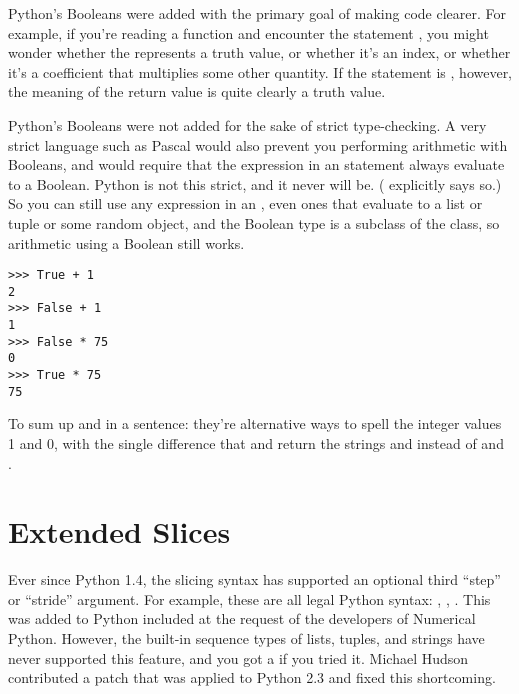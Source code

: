 \documentclass{howto}
\begin{document}
Python's Booleans were added with the primary goal of making code
clearer.  For example, if you're reading a function and encounter the
statement , you might wonder whether the 
represents a truth value, or whether it's an index, or whether it's a
coefficient that multiplies some other quantity.  If the statement is
, however, the meaning of the return value is quite
clearly a truth value.

Python's Booleans were not added for the sake of strict type-checking.
A very strict language such as Pascal would also prevent you
performing arithmetic with Booleans, and would require that the
expression in an  statement always evaluate to a Boolean.
Python is not this strict, and it never will be.  (
explicitly says so.)  So you can still use any expression in an
, even ones that evaluate to a list or tuple or some
random object, and the Boolean type is a subclass of the
 class, so arithmetic using a Boolean still works.

\begin{verbatim}
>>> True + 1
2
>>> False + 1
1
>>> False * 75
0
>>> True * 75
75
\end{verbatim}

To sum up  and  in a sentence: they're
alternative ways to spell the integer values 1 and 0, with the single
difference that  and  return the
strings  and  instead of  and .

\begin{seealso}


\end{seealso}


\section{Extended Slices\label{section-slices}}

Ever since Python 1.4, the slicing syntax has supported an optional
third ``step'' or ``stride'' argument.  For example, these are all
legal Python syntax: , ,
.  This was added to Python included at the request of
the developers of Numerical Python.  However, the built-in sequence
types of lists, tuples, and strings have never supported this feature,
and you got a  if you tried it.  Michael Hudson
contributed a patch that was applied to Python 2.3 and fixed this 
shortcoming.
\end{document}
